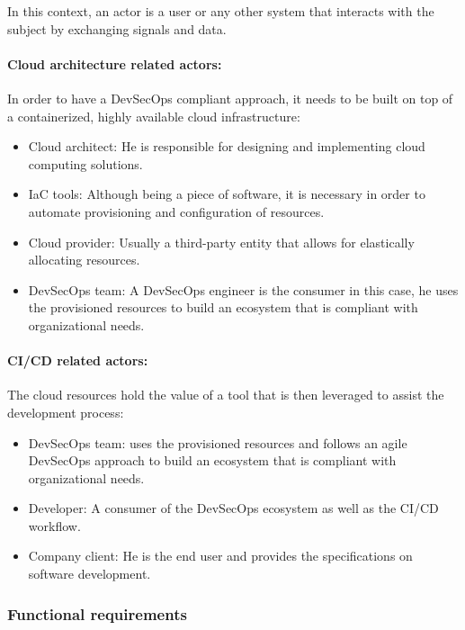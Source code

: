 \hspace{7mm}In this context, an actor is a user or any other system that interacts with the subject by exchanging signals and data.

\paragraph{Cloud architecture related actors:}
\hspace{7mm}In order to have a DevSecOps compliant approach, it needs to be built on top of a containerized, highly available cloud infrastructure:
\begin{itemize}[label={--}]
\item Cloud architect: He is responsible for designing and implementing cloud computing solutions.
\item IaC tools: Although being a piece of software, it is necessary in order to automate provisioning and configuration of resources.
\item Cloud provider: Usually a third-party entity that allows for elastically allocating resources.
\item DevSecOps team: A DevSecOps engineer is the consumer in this case, he uses the provisioned resources to build an ecosystem that is compliant with organizational needs.
\end{itemize}

\paragraph{CI/CD related actors:}
\hspace{7mm}The cloud resources hold the value of a tool that is then leveraged to assist the development process:
\begin{itemize}[label={--}]
\item DevSecOps team: uses the provisioned resources and follows an agile DevSecOps approach to build an ecosystem that is compliant with organizational needs.
\item Developer: A consumer of the DevSecOps ecosystem as well as the CI/CD workflow.
\item Company client: He is the end user and provides the specifications on software development.
\end{itemize}
\newpage
\subsubsection{Functional requirements}

